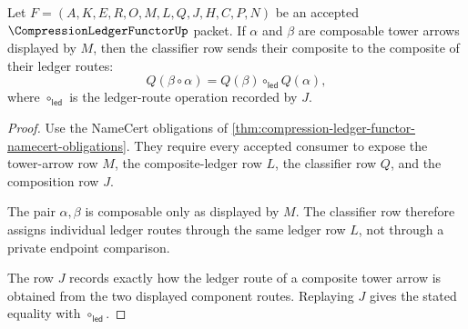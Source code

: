 \begin{theorem}
\label{thm:compression-ledger-functor-composition-law}
Let $F=(A,K,E,R,O,M,L,Q,J,H,C,P,N)$ be an accepted $\CompressionLedgerFunctorUp$ packet. If $\alpha$ and $\beta$ are composable tower arrows displayed by $M$, then the classifier row sends their composite to the composite of their ledger routes:
$$
Q(\beta\circ\alpha)
=
Q(\beta)\circ_{\mathsf{led}}Q(\alpha),
$$
where $\circ_{\mathsf{led}}$ is the ledger-route operation recorded by $J$.
\end{theorem}
\begin{proof}
Use the NameCert obligations of \autoref{thm:compression-ledger-functor-namecert-obligations}. They require every accepted consumer to expose the tower-arrow row $M$, the composite-ledger row $L$, the classifier row $Q$, and the composition row $J$.

The pair $\alpha,\beta$ is composable only as displayed by $M$. The classifier row therefore assigns individual ledger routes through the same ledger row $L$, not through a private endpoint comparison.

The row $J$ records exactly how the ledger route of a composite tower arrow is obtained from the two displayed component routes. Replaying $J$ gives the stated equality with $\circ_{\mathsf{led}}$.
\end{proof}

